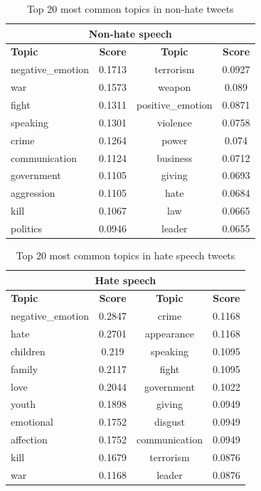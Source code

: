 \documentclass[conference]{IEEEtran}
\begin{document}
\begin{table}[!ht]
    \def\arraystretch{1.2}%
    \begin{center}
      \caption{Top 20 most common topics in non-hate tweets}
      \label{tab:liwc_features_non_hate}
      \begin{tabular}{l c | c c}
        \hline\hline
        \multicolumn{4}{c}{\textbf{Non-hate speech}}\\
        \hline
        \textbf{Topic}&\textbf{Score}&\textbf{Topic}&\textbf{Score}\\
        \hline
        negative\_emotion&0.1713&terrorism&0.0927\\
        war&0.1573&weapon&0.089\\
        fight&0.1311&positive\_emotion&0.0871\\
        speaking&0.1301&violence&0.0758\\
        crime&0.1264&power&0.074\\
        communication&0.1124&business&0.0712\\
        government&0.1105&giving&0.0693\\
        aggression&0.1105&hate&0.0684\\
        kill&0.1067&law&0.0665\\
        politics&0.0946&leader&0.0655\\
        \hline\hline
      \end{tabular}  
    \end{center}
  \end{table}

  \begin{table}[!ht]
    \def\arraystretch{1.2}%
    \begin{center}
      \caption{Top 20 most common topics in hate speech tweets}
      \label{tab:liwc_features_hate}
      \begin{tabular}{l c | c c}
        \hline\hline
        \multicolumn{4}{c}{\textbf{Hate speech}}\\
        \hline
        \textbf{Topic}&\textbf{Score}&\textbf{Topic}&\textbf{Score}\\
        \hline
        negative\_emotion&0.2847&crime&0.1168\\
        hate&0.2701&appearance&0.1168\\
        children&0.219&speaking&0.1095\\
        family&0.2117&fight&0.1095\\
        love&0.2044&government&0.1022\\
        youth&0.1898&giving&0.0949\\
        emotional&0.1752&disgust&0.0949\\
        affection&0.1752&communication&0.0949\\
        kill&0.1679&terrorism&0.0876\\
        war&0.1168&leader&0.0876\\
        \hline\hline
      \end{tabular}  
    \end{center}
  \end{table}
\end{document}
